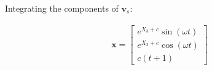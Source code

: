 \begin{problem}
   Integrating the components of $\mathbf{v}_{s}$:
   
   \begin{align}
   \mathbf{x}=\begin{bmatrix}
   e^{X_{3}+c}\sin(\omega t) \\
   e^{X_{3}+c}\cos(\omega t) \\
   c(t+1)
   \end{bmatrix}
   \end{align}

   
   
\end{problem}
